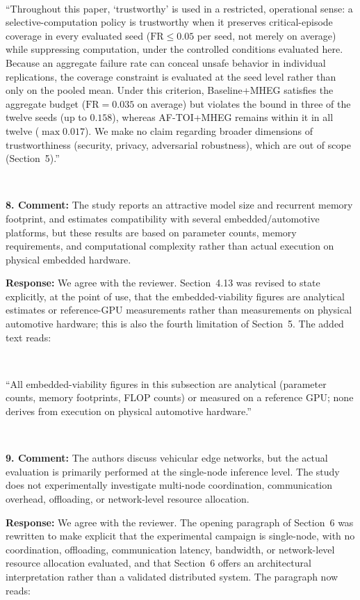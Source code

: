 \documentclass[1p,12pt,authoryear]{elsarticle}
\begin{document}
~

``Throughout this paper, `trustworthy' is used in a restricted, operational sense: a selective-computation policy is trustworthy when it preserves critical-episode coverage in every evaluated seed ($\mathrm{FR} \le 0.05$ per seed, not merely on average) while suppressing computation, under the controlled conditions evaluated here. Because an aggregate failure rate can conceal unsafe behavior in individual replications, the coverage constraint is evaluated at the seed level rather than only on the pooled mean. Under this criterion, Baseline+MHEG satisfies the aggregate budget ($\mathrm{FR}=0.035$ on average) but violates the bound in three of the twelve seeds (up to $0.158$), whereas AF-TOI+MHEG remains within it in all twelve ($\max 0.017$). We make no claim regarding broader dimensions of trustworthiness (security, privacy, adversarial robustness), which are out of scope (Section~5).''

~

\noindent \textbf{8. Comment:} The study reports an attractive model size and recurrent memory footprint, and estimates compatibility with several embedded/automotive platforms, but these results are based on parameter counts, memory requirements, and computational complexity rather than actual execution on physical embedded hardware.

\vspace{2mm}
\noindent \textbf{Response:} We agree with the reviewer. Section~4.13 was revised to state explicitly, at the point of use, that the embedded-viability figures are analytical estimates or reference-GPU measurements rather than measurements on physical automotive hardware; this is also the fourth limitation of Section~5. The added text reads:

~

``All embedded-viability figures in this subsection are analytical (parameter counts, memory footprints, FLOP counts) or measured on a reference GPU; none derives from execution on physical automotive hardware.''

~

\noindent \textbf{9. Comment:} The authors discuss vehicular edge networks, but the actual evaluation is primarily performed at the single-node inference level. The study does not experimentally investigate multi-node coordination, communication overhead, offloading, or network-level resource allocation.

\vspace{2mm}
\noindent \textbf{Response:} We agree with the reviewer. The opening paragraph of Section~6 was rewritten to make explicit that the experimental campaign is single-node, with no coordination, offloading, communication latency, bandwidth, or network-level resource allocation evaluated, and that Section~6 offers an architectural interpretation rather than a validated distributed system. The paragraph now reads:
\end{document}
